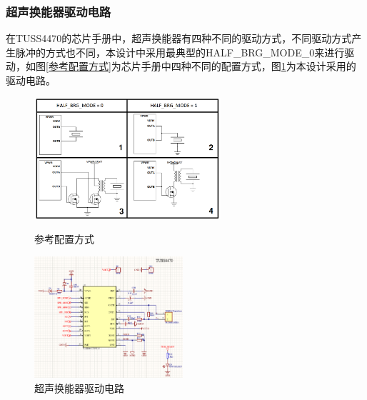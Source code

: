     \subsubsection{超声换能器驱动电路}
    在TUSS4470的芯片手册中，超声换能器有四种不同的驱动方式，不同驱动方式产生脉冲的方式也不同，本设计中采用最典型的HALF\_BRG\_MODE\_0来进行驱动，如图\ref{参考配置方式}为芯片手册中四种不同的配置方式，图\ref{超声换能器驱动电路}为本设计采用的驱动电路。
    \begin{figure}[ht]
	\centering
	
	\begin{minipage}{0.4\linewidth}
		\centering
		\includegraphics[height=4.5cm]{figure/TUSS4470 Transducer Drive Options.png}
		\caption{参考配置方式}
		\label{参考配置方式}%
	\end{minipage}
	\begin{minipage}{0.5\linewidth}
		\centering
		\includegraphics[height=4.5cm]{figure/TUSS4470 peripheral circuit.png}
		\caption{超声换能器驱动电路}
		\label{超声换能器驱动电路}%
	\end{minipage}
\end{figure}

